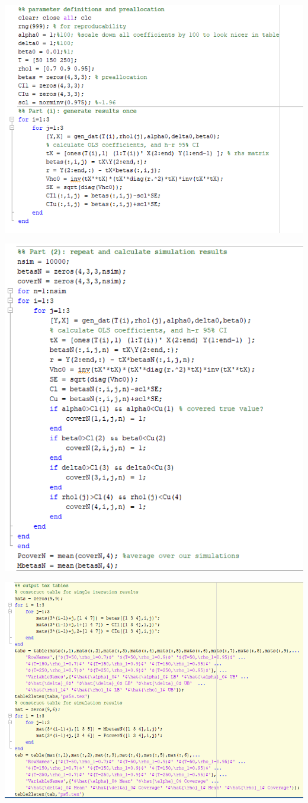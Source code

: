 \documentclass[11pt]{article} %
\begin{document}
\includegraphics{hw5p1}

\includegraphics{hw5p2}

\includegraphics{hw5p3}
\end{document}
